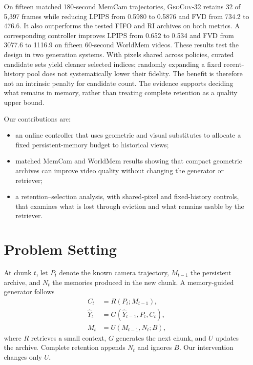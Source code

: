 \documentclass[10pt,twocolumn]{article}
\newcommand{\Geo}{\textsc{GeoCov}\xspace}
\newcommand{\RI}{\textsc{RI}\xspace}
\begin{document}
On fifteen matched 180-second MemCam trajectories, \Geo-32 retains 32 of 5,397
frames while reducing LPIPS from 0.5980 to 0.5876 and FVD from 734.2 to 476.6.
It also outperforms the tested FIFO and \RI archives on both metrics. A
corresponding controller improves LPIPS from 0.652 to 0.534 and FVD from
3077.6 to 1116.9 on fifteen 60-second WorldMem videos. These results test the
design in two generation systems. With pixels shared across policies, curated
candidate sets yield cleaner selected indices; randomly expanding a fixed
recent-history pool does not systematically lower their fidelity. The benefit
is therefore not an intrinsic penalty for candidate count. The evidence
supports deciding what remains in memory, rather than treating complete
retention as a quality upper bound.


Our contributions are:
\begin{itemize}
    \item an online controller that uses geometric and visual substitutes to
    allocate a fixed persistent-memory budget to historical views;
    \item matched MemCam and WorldMem results showing that compact geometric
    archives can improve video quality without changing the generator or
    retriever;
    \item a retention--selection analysis, with shared-pixel and fixed-history
    controls, that examines what is lost through eviction and what remains
    usable by the retriever.
\end{itemize}

\section{Problem Setting}
\label{sec:problem}

At chunk $t$, let $P_t$ denote the known camera trajectory, $M_{t-1}$ the
persistent archive, and $N_t$ the memories produced in the new chunk. A
memory-guided generator follows
\begin{align}
    C_t &= R(P_t;M_{t-1}), \\
    \hat{Y}_t &= G(\hat{Y}_{t-1},P_t,C_t), \\
    M_t &= U(M_{t-1},N_t;B),
\end{align}
where $R$ retrieves a small context, $G$ generates the next chunk, and $U$
updates the archive. Complete retention appends $N_t$ and ignores $B$. Our
intervention changes only $U$.
\end{document}
